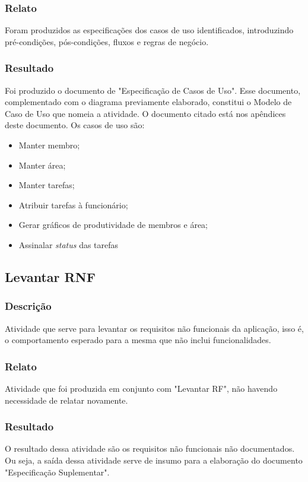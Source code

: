 \subsubsection{Relato}
  Foram produzidos as especificações dos casos de uso identificados, introduzindo pré-condições, pós-condições, fluxos e regras de negócio.

\subsubsection{Resultado}
  Foi produzido o documento de "Especificação de Casos de Uso". Esse documento, complementado com o diagrama previamente elaborado, constitui o Modelo de Caso de Uso que nomeia a atividade. O documento citado está nos apêndices deste documento. Os casos de uso são:
  \begin{itemize}
  \item Manter membro;
  \item Manter área;
  \item Manter tarefas;
  \item Atribuir tarefas à funcionário;
  \item Gerar gráficos de produtividade de membros e área;
  \item Assinalar \textit{status} das tarefas
  \end{itemize}

\subsection{Levantar RNF}
\subsubsection{Descrição}
Atividade que serve para levantar os requisitos não funcionais da aplicação, isso é, o comportamento esperado para a mesma que não inclui funcionalidades.

\subsubsection{Relato}
Atividade que foi produzida em conjunto com "Levantar RF", não havendo necessidade de relatar novamente.

\subsubsection{Resultado}
O resultado dessa atividade são os requisitos não funcionais não documentados. Ou seja, a saída dessa atividade serve de insumo para a elaboração do documento "Especificação Suplementar".

